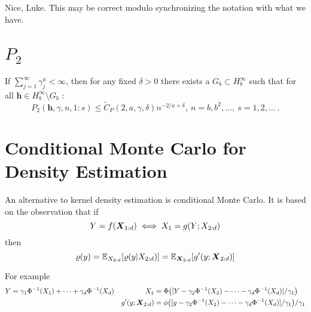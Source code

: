 \documentclass[letterpaper]{amsart}
\newcommand{\FJHNote}[1]{{\color{blue} #1}}
\begin{document}
\FJHNote{Nice, Luke.  This may be correct modulo synchronizing the notation with what we have.}


\section{$P_2$}

If $\sum_{j=1}^{\infty}\gamma^a_j < \infty$, then for any fixed $\delta > 0$ there exists a  $G_b \subset H^\infty_b$ such that for all $\textbf{h} \in H^\infty_b \setminus G_b$ : \\

 \[  P_2(\textbf{h},\gamma, n, 1:s) \leq \tilde C_P(2,a,\gamma, \delta)n^{-2/a+\delta}, \ n = b, b^2, \ldots,\  s = 1,2, \ldots \ .
\] \cite[Equation 12]{HicNie03a}


\section{Conditional Monte Carlo for Density Estimation}
An alternative to kernel density estimation is conditional Monte Carlo.  It is based on the observation that if
\[
Y = f(\boldsymbol{X}_{1:d}) \iff X_1 = g(Y; X_{2:d})
\]
then 
\[
\varrho(y) = \operatorname{\mathbb{E}}_{X_{2:d}} [\varrho(y |X_{2:d})] = \operatorname{\mathbb{E}}_{\boldsymbol{X}_{2:d}} [g'(y; \boldsymbol{X}_{2:d})]
\]

For example
\begin{align*}
    Y &= \gamma_1\Phi^{-1}(X_1) + \cdots + \gamma_d\Phi^{-1}(X_d) & X_1 &= \Phi\bigl([Y - \gamma_2\Phi^{-1}(X_2) - \cdots - \gamma_d\Phi^{-1}(X_d)]/\gamma_1 \bigr) \\
    && g'(y; \boldsymbol{X}_{2:d}) & = \phi\bigl([y - \gamma_2\Phi^{-1}(X_2) - \cdots - \gamma_d\Phi^{-1}(X_d)]/\gamma_1 \bigr)/\gamma_1
\end{align*}
\end{document}
